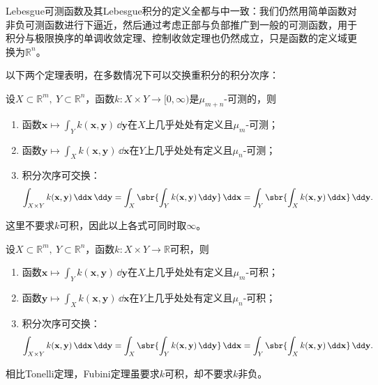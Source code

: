 Lebesgue可测函数及其Lebesgue积分的定义全都与中一致：我们仍然用简单函数对非负可测函数进行下逼近，然后通过考虑正部与负部推广到一般的可测函数，用于积分与极限换序的单调收敛定理、控制收敛定理也仍然成立，只是函数的定义域更换为$\mathbb{R}^n$。

以下两个定理表明，在多数情况下可以交换重积分的积分次序：
\begin{theorem}[Tonelli定理]\label{thm:tonelli}
    设$X\subset\mathbb{R}^m,\ Y\subset\mathbb{R}^n$，函数$k:X\times Y\to[0,\infty)$是$\mu_{m+n}$-可测的，则
    \begin{enumerate}
        \item 函数$\mathbf{x}\mapsto \int_{Y}k(\mathbf{x},\mathbf{y})\,\dd\mathbf{y}$在$X$上几乎处处有定义且$\mu_m$-可测；
        \item 函数$\mathbf{y}\mapsto \int_{X}k(\mathbf{x},\mathbf{y})\,\dd\mathbf{x}$在$Y$上几乎处处有定义且$\mu_n$-可测；
        \item 积分次序可交换：
              \begin{equation}
                  \int_{X\times Y}k(\mathbf{x},\mathbf{y})\,\dd\mathbf{x}\,\dd\mathbf{y}=\int_X\sbr{\int_Y k(\mathbf{x},\mathbf{y})\,\dd\mathbf{y}}\,\dd\mathbf{x}=\int_Y\sbr{\int_X k(\mathbf{x},\mathbf{y})\,\dd\mathbf{x}}\,\dd\mathbf{y}.
              \end{equation}
    \end{enumerate}
    这里不要求$k$可积，因此以上各式可同时取$\infty$。
\end{theorem}

\begin{theorem}[Fubini定理]\label{thm:fubini}
    设$X\subset\mathbb{R}^m,\ Y\subset\mathbb{R}^n$，函数$k:X\times Y\to\mathbb{R}$可积，则
    \begin{enumerate}
        \item 函数$\mathbf{x}\mapsto \int_{Y}k(\mathbf{x},\mathbf{y})\,\dd\mathbf{y}$在$X$上几乎处处有定义且$\mu_m$-可积；
        \item 函数$\mathbf{y}\mapsto \int_{X}k(\mathbf{x},\mathbf{y})\,\dd\mathbf{x}$在$Y$上几乎处处有定义且$\mu_n$-可积；
        \item 积分次序可交换：
              \begin{equation}
                  \int_{X\times Y}k(\mathbf{x},\mathbf{y})\,\dd\mathbf{x}\,\dd\mathbf{y}=\int_X\sbr{\int_Y k(\mathbf{x},\mathbf{y})\,\dd\mathbf{y}}\,\dd\mathbf{x}=\int_Y\sbr{\int_X k(\mathbf{x},\mathbf{y})\,\dd\mathbf{x}}\,\dd\mathbf{y}.
              \end{equation}
    \end{enumerate}
\end{theorem}
相比Tonelli定理，Fubini定理虽要求$k$可积，却不要求$k$非负。

